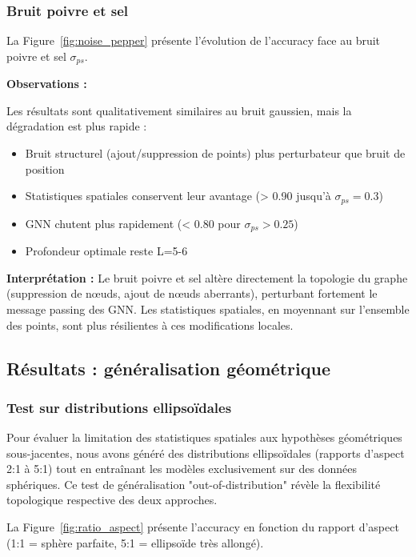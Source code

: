 \subsubsection{Bruit poivre et sel}

La Figure~\ref{fig:noise_pepper} présente l'évolution de l'accuracy face au bruit poivre et sel $\sigma_{ps}$.

\textbf{Observations :}

Les résultats sont qualitativement similaires au bruit gaussien, mais la dégradation est plus rapide :
\begin{itemize}
    \item Bruit structurel (ajout/suppression de points) plus perturbateur que bruit de position
    \item Statistiques spatiales conservent leur avantage (> 0.90 jusqu'à $\sigma_{ps}=0.3$)
    \item GNN chutent plus rapidement (< 0.80 pour $\sigma_{ps} > 0.25$)
    \item Profondeur optimale reste L=5-6
\end{itemize}

\textbf{Interprétation :} Le bruit poivre et sel altère directement la topologie du graphe (suppression de nœuds, ajout de nœuds aberrants), perturbant fortement le message passing des GNN. Les statistiques spatiales, en moyennant sur l'ensemble des points, sont plus résilientes à ces modifications locales.

\subsection{Résultats : généralisation géométrique}

\subsubsection{Test sur distributions ellipsoïdales}

Pour évaluer la limitation des statistiques spatiales aux hypothèses géométriques sous-jacentes, nous avons généré des distributions ellipsoïdales (rapports d'aspect 2:1 à 5:1) tout en entraînant les modèles exclusivement sur des données sphériques. Ce test de généralisation "out-of-distribution" révèle la flexibilité topologique respective des deux approches.

La Figure~\ref{fig:ratio_aspect} présente l'accuracy en fonction du rapport d'aspect (1:1 = sphère parfaite, 5:1 = ellipsoïde très allongé).

